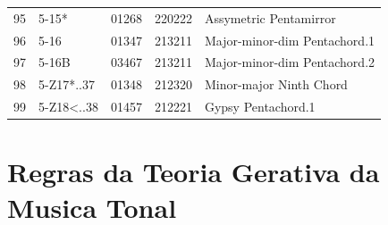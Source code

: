 \documentclass[
	12pt,				%
	openright,			%
	twoside,			%
	a4paper,			%
	english,			%
	french,				%
	spanish,			%
	brazil				%
	]{abntex2}
\begin{document}
\begin{anexosenv}
\begin{table}[h]
\begin{tabular}{lllll}
95 & 5-15*                          & 01268 & 220222          & Assymetric Pentamirror                            \\
96 & 5-16                           & 01347 & 213211          & Major-minor-dim Pentachord.1                      \\
97 & 5-16B                          & 03467 & 213211          & Major-minor-dim Pentachord.2                      \\
98 & 5-Z17*..37                     & 01348 & 212320          & Minor-major Ninth Chord                           \\
99 & 5-Z18\textless..38             & 01457 & 212221          & Gypsy Pentachord.1                               

\end{tabular}
\end{table}


\chapter{Regras da Teoria Gerativa da Musica Tonal}


\end{anexosenv}

\printindex
\end{document}
